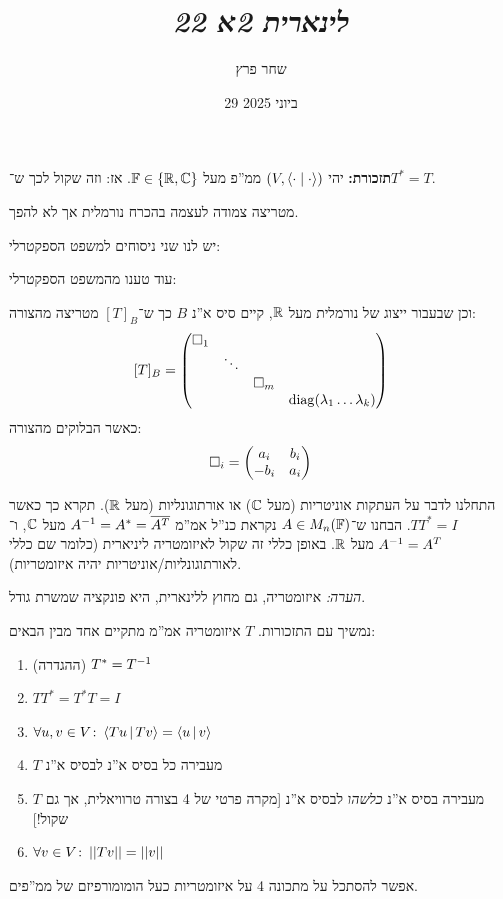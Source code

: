 \documentclass[]{../../../../tex/classes/styledArticle}
\author{שחר פרץ}
\title{\textit{לינארית 2א 22}}
\date{29 ביוני 2025}
\begin{document}
	\maketitle
	\textbf{תזכורת: }יהי $(V, \left \langle \cdot \mid \cdot \right \rangle)$ ממ''פ מעל $\mathbb{F} \in \{\mathbb{R}, \mathbb{C}\}$. אז: 
	וזה שקול לכך ש־$T^* = T$. 
	
	מטריצה צמודה לעצמה בהכרח נורמלית אך לא להפך. 
	
	יש לנו שני ניסוחים למשפט הספקטרלי: 
	
	
	\dotfill
	
	עוד טענו מהמשפט הספקטרלי: 
	
	וכן שבעבור ייצוג של נורמלית מעל $\mathbb{R}$, קיים סיס א''נ $B$ כך ש־$[T]_B$ מטריצה מהצורה: 
	\[ [T]_B = \begin{pmatrix} \square_1 \\ & \ddots \\ &&\square_m \\ &&& \operatorname{diag}(\lambda_1 \dots \lambda_k) \end{pmatrix} \]
	כאשר הבלוקים מהצורה: 
	\[ \square_i = \begin{pmatrix} a_i & b_i \\ -b_i & a_i \end{pmatrix} \]
	
	\dotfill
	
	התחלנו לדבר על העתקות אוניטריות (מעל $\mathbb{C}$) או אורתוגונליות (מעל $\mathbb{R}$). תקרא כך כאשר $TT^* = I$. הבחנו ש־$A \in M_n(\mathbb{F})$ נקראת כנ''ל אמ''מ $A^{-1} = A^* = \overline{A^T}$ מעל $\mathbb{C}$, ו־$A^{-1} = A^T$ מעל $\mathbb{R}$. באופן כללי זה שקול לאיזומטריה ליניארית (כלומר שם כללי לאורתוגונליות/אוניטריות יהיה איזומטריות). 
	
	\textit{הערה: }איזומטריה, גם מחוץ ללינארית, היא פונקציה שמשרת גודל. 
	
	נמשיך עם התזכורות. $T$ איזומטריה אמ''מ מתקיים אחד מבין הבאים: 
	\begin{enumerate}
		\item (ההגדרה) \hfil $T^* = T^{-1}$
		\item \hfil $TT^* = T^*T = I$
		\item \hfil $\forall u, v \in V \colon \left \langle Tu \,\middle|\, Tv \right \rangle = \left \langle u \,\middle|\, v \right \rangle$
		\item $T$ מעבירה כל בסיס א''נ לבסיס א''נ
		\item $T$ מעבירה בסיס א''נ \textit{כלשהו} לבסיס א''נ [מקרה פרטי של 4 בצורה טרוויאלית, אך גם שקול!]
		\item \hfil $\forall v \in V \colon \left \vert \left \vert Tv \right \vert \right \vert = \left \vert \left \vert v \right \vert \right \vert$
	\end{enumerate}
	אפשר להסתכל על מתכונה 4 על איזומטריות כעל הומומורפיזם של ממ''פים. 
	
\end{document}
